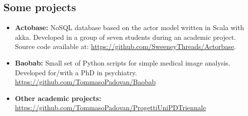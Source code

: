 \documentclass[letterpaper]{twentysecondcv} %
\begin{document}

\newpage %

\normalsize
\makeprofile %

\subsection{Some projects}
\small
\begin{itemize}[noitemsep,nolistsep]
	\item \textbf{Actobase:} NoSQL database based on the actor model written in Scala with akka. Developed in a group of seven students during an academic project. Source code available at: \url{https://github.com/SweeneyThreads/Actorbase}.
	\item \textbf{Baobab:} Small set of Python scripts for simple medical image analysis. Developed for/with a PhD in psychiatry. \url{https://github.com/TommasoPadovan/Baobab}
	\item \textbf{Other academic projects:} \\\url{https://github.com/TommasoPadovan/ProgettiUniPDTriennale}
\end{itemize}


\tiny
{}
\end{document}
